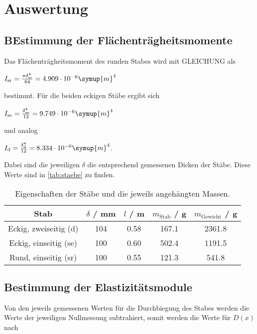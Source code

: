 \section{Auswertung}
\label{sec:Auswertung}
\subsection{BEstimmung der Flächenträgheitsmomente}
%
Das Flächenträgheitsmoment des runden Stabes wird mit GLEICHUNG als

\centerline{$I_\text{sr} = \frac{\pi \delta_\text{sr}^4}{64} = 4.909 \cdot 10^{-6} \symup{m}^4$}

bestimmt. Für die beiden eckigen Stäbe ergibt sich 

\centerline{$I_\text{se} = \frac{\delta_\text{se}^4}{12} = 9.749 \cdot 10^{-6} \symup{m}^4$}

und analog

\centerline{$I_\text{d} = \frac{\delta_\text{d}^4}{12} = 8.334 \cdot 10^{-6} \symup{m}^4$.}

Dabei sind die jeweiligen $\delta$ die entsprechend gemessenen Dicken der Stäbe. Diese Werte sind in \autoref{tab:staebe} zu finden.

\begin{table}[!htp]
  \centering
  \caption{Eigenschaften der Stäbe und die jeweils angehängten Massen.}
  \label{tab:staebe}
  \begin{tabular}{c S[table-format=3.0] S[table-format=1.2] S[table-format=3.1] S[table-format=4.1]}
    \toprule
    {Stab} & {$\delta$ / mm} & {$l$ / m} & {$m_\text{Stab}$ / g} & {$m_\text{Gewicht}$ / g} \\
    \midrule
    Eckig, zweiseitig (d) & 104 & 0.58 & 167.1 & 2361.8 \\
    Eckig, einseitig  (se) & 100 & 0.60 & 502.4 & 1191.5 \\
    Rund, einseitig   (sr)  & 100 & 0.55 & 121.3 &  541.8 \\
    \bottomrule
  \end{tabular}
\end{table}

\subsection{Bestimmung der Elastizitätsmodule}

Von den jeweils gemessenen Werten für die Durchbiegung des Stabes werden die Werte der jeweiligen Nullmessung subtrahiert, somit werden die Werte für $D(x)$ nach

